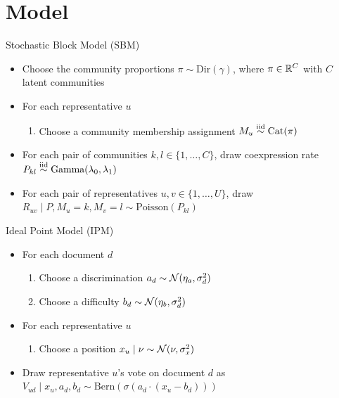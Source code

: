 \documentclass{article}
\begin{document}
\section{Model}
\label{model}


\noindent Stochastic Block Model (SBM)
\begin{itemize}
\item Choose the community proportions $\pi \sim \text{Dir}(\gamma)$, where $\pi\in \mathbb{R}^C$ with $C$ latent communities
\item For each representative $u$
\begin{enumerate}
\item Choose a community membership assignment $M_u\stackrel{\tiny\text{iid}}{\sim} \text{Cat}(\pi)$
\end{enumerate}
\item For each pair of communities $k, l\in\{1,\dots, C\}$, draw coexpression rate $P_{kl} \stackrel{\tiny\text{iid}}{\sim} \text{Gamma}(\lambda_0,\lambda_1)$%
\item For each pair of representatives $u,v\in\{1,\dots, U\}$, draw $R_{uv} \mid P, M_u=k, M_v=l\sim \text{Poisson}(P_{kl})$
\end{itemize}


\noindent Ideal Point Model (IPM)
\begin{itemize}
\item For each document $d$
\begin{enumerate}
\item Choose a discrimination $a_d \sim \mathcal{N}(\eta_{a},\sigma^2_d)$
\item Choose a difficulty $b_d \sim \mathcal{N}(\eta_{b},\sigma^2_d)$
\end{enumerate}
\item For each representative $u$
\begin{enumerate}
\item Choose a position $x_u\mid \nu \sim \mathcal{N}(\nu,\sigma^2_x)$
\end{enumerate}
\item Draw representative $u$'s vote on document $d$ as $V_{ud} \mid x_u, a_d, b_d \sim \text{Bern}(\sigma(a_d\cdot(x_u-b_d)))$%
\end{itemize}
\end{document}
